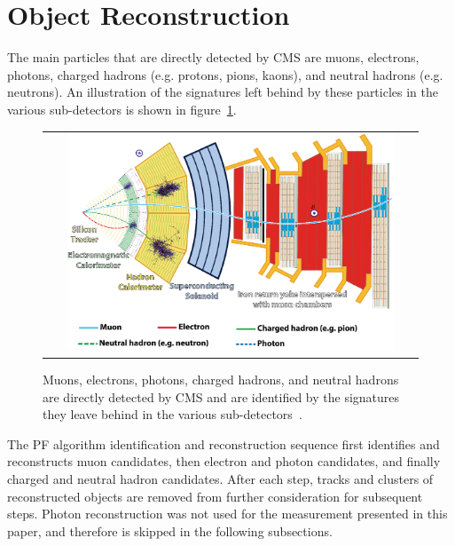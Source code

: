 \section{Object Reconstruction}
The main particles that are directly detected by CMS are muons, electrons, photons, charged hadrons (e.g. protons, pions, kaons), and neutral hadrons (e.g. neutrons).
An illustration of the signatures left behind by these particles in the various sub-detectors is shown in figure~\ref{CMS_Layers}.
\begin{figure}[htb]
  \begin{center}
    \begin{tabular}{c}
        \includegraphics[width=0.9\textwidth]{fig_LHC_CMS/CMS_Layers.png}
    \end{tabular}
    \caption{Muons, electrons, photons, charged hadrons, and neutral hadrons are directly detected by CMS and are identified by the signatures they leave behind in the various sub-detectors~\cite{Sirunyan:2270046}.
            }
    \label{CMS_Layers}
  \end{center}
\end{figure}
The PF algorithm identification and reconstruction sequence first identifies and reconstructs muon candidates, then electron and photon candidates, and finally charged and neutral hadron candidates.
After each step, tracks and clusters of reconstructed objects are removed from further consideration for subsequent steps.
Photon reconstruction was not used for the measurement presented in this paper, and therefore is skipped in the following subsections.

